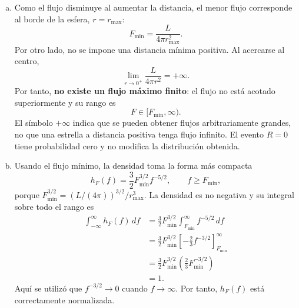 \documentclass[a4paper]{article}
\begin{document}
\begin{enumerate}[a)]
El valor absoluto del Jacobiano convierte los intervalos de flujo en intervalos de distancia con longitud positiva. Derivando la expresión de $r(f)$,
$$
\frac{dr}{df}
=-\frac{1}{2}\left(\frac{L}{4\pi}\right)^{1/2}f^{-3/2},
\qquad
\left|\frac{dr}{df}\right|
=\frac{1}{2}\left(\frac{L}{4\pi}\right)^{1/2}f^{-3/2}.
$$
Además, al evaluar la densidad radial en $r(f)$,
$$
g_R\bigl(r(f)\bigr)
=\frac{3}{r_{\max}^3}\left(\frac{L}{4\pi f}\right).
$$
Sustituyendo ambos factores en la fórmula de transformación,
\begin{align*}
h_F(f)
&=\frac{3}{r_{\max}^3}\left(\frac{L}{4\pi}\right)f^{-1}
  \frac{1}{2}\left(\frac{L}{4\pi}\right)^{1/2}f^{-3/2}\\
&=\frac{3}{2r_{\max}^3}\left(\frac{L}{4\pi}\right)^{3/2}f^{-5/2}.
\end{align*}
Esta expresión es válida cuando $0<r(f)\le r_{\max}$, lo que equivale a $f\ge L/(4\pi r_{\max}^2)$. En consecuencia,
$$
\boxed{
h_F(f)=
\begin{cases}
\dfrac{3}{2r_{\max}^3}\left(\dfrac{L}{4\pi}\right)^{3/2}f^{-5/2},
& f\ge\dfrac{L}{4\pi r_{\max}^2},\\[3mm]
0, & \text{en otro caso}.
\end{cases}}
$$

\item Como el flujo disminuye al aumentar la distancia, el menor flujo corresponde al borde de la esfera, $r=r_{\max}$:
$$
\boxed{F_{\min}=\frac{L}{4\pi r_{\max}^2}.}
$$
Por otro lado, no se impone una distancia mínima positiva. Al acercarse al centro,
$$
\lim_{r\to0^+}\frac{L}{4\pi r^2}=+\infty.
$$
Por tanto, \textbf{no existe un flujo máximo finito}: el flujo no está acotado superiormente y su rango es
$$
\boxed{F\in[F_{\min},\infty).}
$$
El símbolo $+\infty$ indica que se pueden obtener flujos arbitrariamente grandes, no que una estrella a distancia positiva tenga flujo infinito. El evento $R=0$ tiene probabilidad cero y no modifica la distribución obtenida.

\item Usando el flujo mínimo, la densidad toma la forma más compacta
$$
h_F(f)=\frac{3}{2}F_{\min}^{3/2}f^{-5/2},
\qquad f\ge F_{\min},
$$
porque $F_{\min}^{3/2}=(L/(4\pi))^{3/2}/r_{\max}^3$. La densidad es no negativa y su integral sobre todo el rango es
\begin{align*}
\int_{-\infty}^{\infty}h_F(f)\,df
&=\frac{3}{2}F_{\min}^{3/2}\int_{F_{\min}}^\infty f^{-5/2}\,df\\
&=\frac{3}{2}F_{\min}^{3/2}
  \left[-\frac{2}{3}f^{-3/2}\right]_{F_{\min}}^\infty\\
&=\frac{3}{2}F_{\min}^{3/2}
  \left(\frac{2}{3}F_{\min}^{-3/2}\right)\\
&=1.
\end{align*}
Aquí se utilizó que $f^{-3/2}\to0$ cuando $f\to\infty$. Por tanto, $h_F(f)$ está correctamente normalizada.


\end{enumerate}
\end{document}
